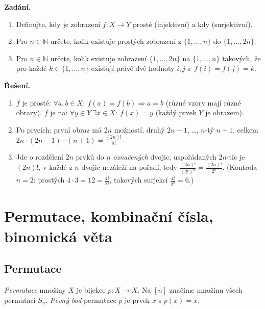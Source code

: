 \documentclass[11pt,a4paper]{article}
\begin{document}
\begin{priklad} \par
\textbf{Zadání.}
\begin{enumerate}[label=(\arabic*)]
  \item Definujte, kdy je zobrazení $f\colon X\to Y$ prosté (injektivní) a kdy  (surjektivní).
  \item Pro $n\in\mathbb{N}$ určete, kolik existuje prostých zobrazení z $\{1,\dots,n\}$ do $\{1,\dots,2n\}$.
  \item Pro $n\in\mathbb{N}$ určete, kolik existuje zobrazení $\{1,\dots,2n\}$ na $\{1,\dots,n\}$ takových, že pro každé $k\in\{1,\dots,n\}$ existují právě dvě hodnoty $i,j$ s~$f(i)=f(j)=k$.
\end{enumerate}
\textbf{Řešení.}
\begin{enumerate}[label=(\arabic*)]
  \item $f$ je prosté: $\forall a,b\in X:\ f(a)=f(b)\Rightarrow a=b$ (různé vzory mají různé obrazy). $f$ je na: $\forall y\in Y\ \exists x\in X:\ f(x)=y$ (každý prvek $Y$ je obrazem).
  \item Po prvcích: první obraz má $2n$ možností, druhý $2n-1$, \dots, $n$-tý $n+1$, celkem $2n\cdot(2n-1)\cdots(n+1)=\frac{(2n)!}{n!}$.
  \item Jde o rozdělení $2n$ prvků do $n$ \emph{označených} dvojic; uspořádaných $2n$-tic je $(2n)!$, v každé z $n$ dvojic nezáleží na pořadí, tedy $\frac{(2n)!}{(2!)^n}=\frac{(2n)!}{2^n}$. (Kontrola $n=2$: prostých $4\cdot3=12=\frac{4!}{2!}$, takových surjekcí $\frac{4!}{2^2}=6$.)
\end{enumerate}
\end{priklad}

\section{Permutace, kombinační čísla, binomická věta}

\subsection{Permutace}

\begin{definice}
\emph{Permutace} množiny $X$ je bijekce $p\colon X\to X$. Na $[n]$ značíme množinu všech permutací $S_n$. \emph{Pevný bod} permutace $p$ je prvek $x$ s $p(x)=x$.
\end{definice}
\end{document}
